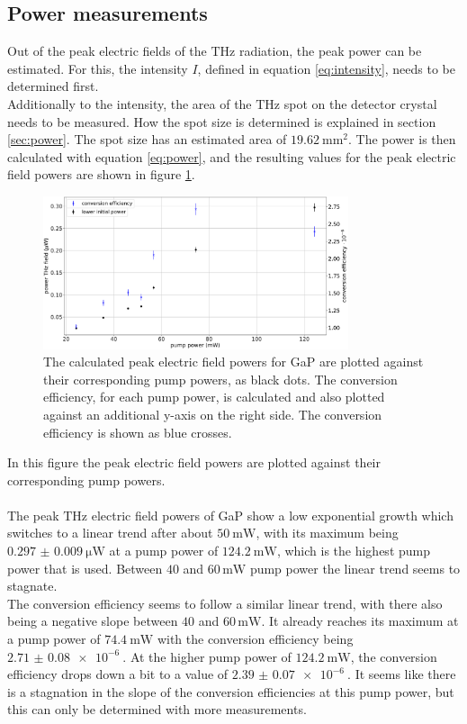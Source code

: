 \subsection{Power measurements}
Out of the peak electric fields of the $\si{\tera\hertz}$ radiation, the peak power can be estimated.
For this, the intensity $I$, defined in equation \eqref{eq:intensity}, needs to be determined first.
\\
Additionally to the intensity, the area of the $\si{\tera\hertz}$ spot on the detector crystal needs to be measured.
How the spot size is determined is explained in section \ref{sec:power}.
The spot size has an estimated area of $\SI{19.62}{\milli\meter\squared}$.
The power is then calculated with equation \eqref{eq:power}, and the resulting values for the peak electric field powers are shown in figure \ref{fig:gap_power}.\FloatBarrier
\begin{figure}
    \centering
    \includegraphics[width=0.8\textwidth]{Plots/Powergap.pdf}
    \caption{The calculated peak electric field powers for GaP are plotted against their corresponding pump powers, as black dots.
    The conversion efficiency, for each pump power, is calculated and also plotted against an additional y-axis on the right side.
    The conversion efficiency is shown as blue crosses.}
    \label{fig:gap_power}\FloatBarrier
\end{figure}
In this figure the peak electric field powers are plotted against their corresponding pump powers.
\\\\
The peak $\si{\tera\hertz}$ electric field powers of GaP show a low exponential growth which switches to a linear trend after about $\SI{50}{\milli\W}$, with its maximum being $\SI{0.297(9)}{\micro\W}$ at a pump power of $\SI{124.2}{\milli\W}$, which is the highest pump power that is used.
Between $40$ and $60 \, \si{\milli\W}$ pump power the linear trend seems to stagnate.
\\
The conversion efficiency seems to follow a similar linear trend, with there also being a negative slope between  $40$ and $60 \, \si{\milli\W}$.
It already reaches its maximum at a pump power of $\SI{74.4}{\milli\W}$ with the conversion efficiency being $\SI{2.71(8)e-6}{}$.
At the higher pump power of $\SI{124.2}{\milli\W}$, the conversion efficiency drops down a bit to a value of $\SI{2.39(7)e-6}{}$.
It seems like there is a stagnation in the slope of the conversion efficiencies at this pump power, but this can only be determined with more measurements.
\FloatBarrier
